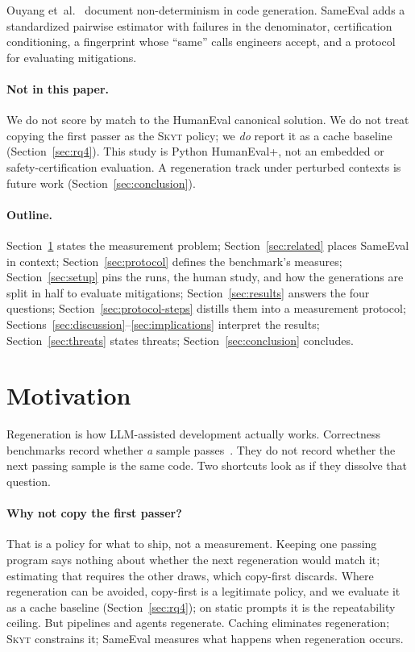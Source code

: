 \documentclass[acmsmall,screen,review,anonymous]{acmart}
\newcommand{\skyt}{\textsc{Skyt}}
\newcommand{\sameeval}{SameEval}
\newcommand{\etal}{et~al.}
\begin{document}
Ouyang \etal{}~\cite{ouyang2023llm} document non-determinism in code
generation.
\sameeval{} adds a standardized pairwise estimator with failures in the
denominator, certification conditioning, a fingerprint whose ``same'' calls
engineers accept, and a protocol for evaluating mitigations.

\paragraph{Not in this paper.}
We do not score by match to the HumanEval canonical solution.
We do not treat copying the first passer as the \skyt{} policy; we \emph{do}
report it as a cache baseline (Section~\ref{sec:rq4}).
This study is Python HumanEval+, not an embedded or safety-certification
evaluation.
A regeneration track under perturbed contexts is future work
(Section~\ref{sec:conclusion}).

\paragraph{Outline.}
Section~\ref{sec:motivation} states the measurement problem;
Section~\ref{sec:related} places \sameeval{} in context;
Section~\ref{sec:protocol} defines the benchmark's measures;
Section~\ref{sec:setup} pins the runs, the human study, and how the generations are split in half to
evaluate mitigations;
Section~\ref{sec:results} answers the four questions;
Section~\ref{sec:protocol-steps} distills them into a measurement protocol;
Sections~\ref{sec:discussion}--\ref{sec:implications} interpret the results;
Section~\ref{sec:threats} states threats; Section~\ref{sec:conclusion}
concludes.

\section{Motivation}
\label{sec:motivation}

Regeneration is how LLM-assisted development actually works.
Correctness benchmarks record whether \emph{a} sample
passes~\cite{chen2021evaluating,liu2023evalplus}.
They do not record whether the next passing sample is the same code.
Two shortcuts look as if they dissolve that question.

\paragraph{Why not copy the first passer?}
That is a policy for what to ship, not a measurement.
Keeping one passing program says nothing about whether the next
regeneration would match it; estimating that requires the other draws,
which copy-first discards.
Where regeneration can be avoided, copy-first is a legitimate policy, and
we evaluate it as a cache baseline (Section~\ref{sec:rq4}); on static
prompts it is the repeatability ceiling.
But pipelines and agents regenerate.
Caching eliminates regeneration; \skyt{} constrains it; \sameeval{}
measures what happens when regeneration occurs.
\end{document}
